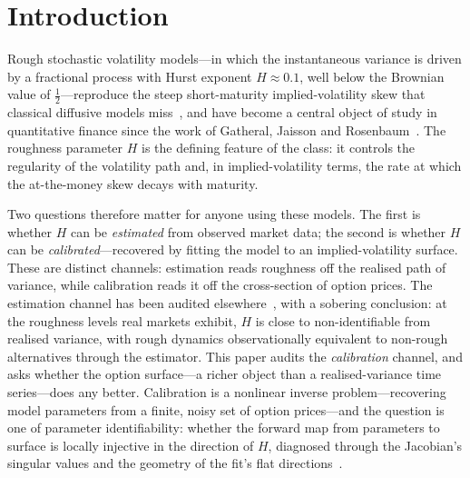 \documentclass[namedate,webpdf]{ima-authoring-template}
\numberwithin{equation}{section}
\begin{document}

\maketitle

\section{Introduction}\label{sec:intro}

Rough stochastic volatility models---in which the instantaneous variance is driven by a
fractional process with Hurst exponent $H\approx 0.1$, well below the Brownian value of
$\tfrac12$---reproduce the steep short-maturity implied-volatility skew that classical
diffusive models miss~\citep{bfg2016}, and have become a central object of study in quantitative finance
since the work of Gatheral, Jaisson and Rosenbaum~\citeyearpar{gjr2018}. The roughness parameter $H$ is the
defining feature of the class: it controls the regularity of the volatility path and, in
implied-volatility terms, the rate at which the at-the-money skew decays with maturity.

Two questions therefore matter for anyone using these models. The first is whether $H$ can
be \emph{estimated} from observed market data; the second is whether $H$ can be
\emph{calibrated}---recovered by fitting the model to an implied-volatility surface. These
are distinct channels: estimation reads roughness off the realised path of variance, while
calibration reads it off the cross-section of option prices. The estimation channel has been
audited elsewhere~\citep{lumor_identifiability}, with a sobering conclusion: at the roughness
levels real markets exhibit,
$H$ is close to non-identifiable from realised variance, with rough dynamics observationally
equivalent to non-rough alternatives through the estimator. This paper audits the
\emph{calibration} channel, and asks whether the option surface---a richer object than a
realised-variance time series---does any better. Calibration is a nonlinear inverse
problem---recovering model parameters from a finite, noisy set of option prices---and the
question is one of parameter identifiability: whether the forward map from parameters to
surface is locally injective in the direction of $H$, diagnosed through the Jacobian's
singular values and the geometry of the fit's flat directions~\citep{kaipio2005}.
\end{document}
